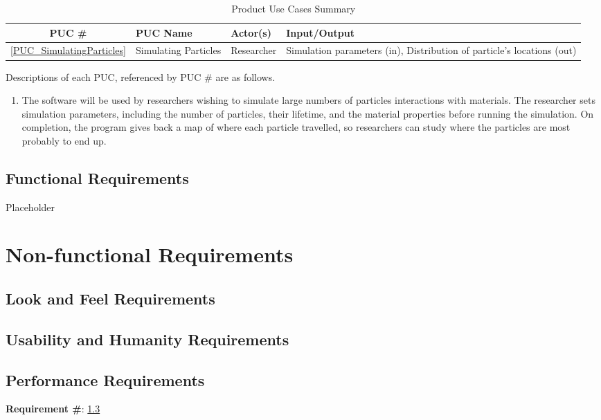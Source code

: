 \documentclass[12pt]{article}
\begin{document}
\begin{table}[h]
\centering
\begin{tabularx}{\textwidth}{|c|l|l|X|}
\hline
PUC \# & PUC Name & Actor(s) & Input/Output\\
\hline\hline
\ref{PUC_SimulatingParticles} & Simulating Particles & Researcher & Simulation parameters (in), Distribution of particle's locations (out)\\
\hline
\end{tabularx}
\caption{Product Use Cases Summary}
\end{table}

Descriptions of each PUC, referenced by PUC \# are as follows.
\begin{enumerate}
\item \label{PUC_SimulatingParticles} The software will be used by researchers wishing to simulate large numbers of particles interactions with materials. The researcher sets simulation parameters, including the number of particles, their lifetime, and the material properties before running the simulation. On completion, the program gives back a map of where each particle travelled, so researchers can study where the particles are most probably to end up.
\end{enumerate}

\subsection{Functional Requirements} %
Placeholder

\section{Non-functional Requirements}
\subsection{Look and Feel Requirements} %
\subsection{Usability and Humanity Requirements} %

\subsection{Performance Requirements}\label{Req_Performance}

\textbf{Requirement \#}: \ref{Req_Performance}\\
\end{document}
